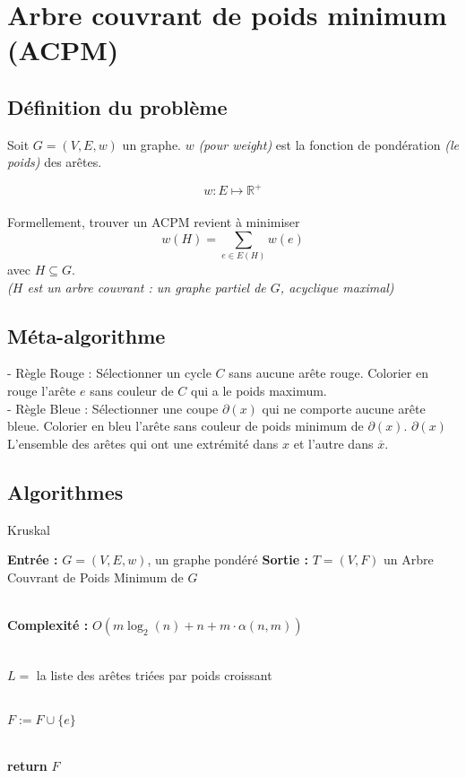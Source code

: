 \documentclass{article}      %
\begin{document}
\section{Arbre couvrant de poids minimum (ACPM)}

\subsection{Définition du problème}
Soit $G = (V, E, w)$ un graphe.
$w$ \textit{(pour weight)} est la fonction de pondération \textit{(le poids)} des arêtes.

$$w : E \mapsto \mathbb{R}^+$$
%
\\
Formellement, trouver un ACPM revient à minimiser 
$$w(H) = \sum_{e \in E(H)} w(e)$$ 
avec $H \subseteq G$.
\\ \textit{($H$ est un arbre couvrant : un graphe partiel de $G$, acyclique maximal)}

\subsection{Méta-algorithme}

- Règle Rouge : Sélectionner un cycle $C$ sans aucune arête rouge.
Colorier en rouge l’arête $e$ sans couleur de $C$ qui a le poids maximum.
\\- Règle Bleue : Sélectionner une coupe $\partial(x)$ qui ne comporte aucune arête bleue.
Colorier en bleu l’arête sans couleur de poids minimum de $\partial(x)$. 
%
$\partial(x)$ L’ensemble des arêtes qui ont une extrémité dans $x$ et l’autre dans $\overline{x}$. 


\subsection{Algorithmes}
\begin{algorithm} \caption{Kruskal}
\begin{algorithmic}

\State \textbf{Entrée :} $G = (V, E, w)$, un graphe pondéré
\State \textbf{Sortie :} $T = (V, F)$ un Arbre Couvrant de Poids Minimum de $G$

\\ \State \textbf{Complexité :} $O(m\log_2(n) + n + m \cdot \alpha(n,m))$

\\ \State $L =$ la liste des arêtes triées par poids croissant

\\
        \State $F := F \cup \{e\}$
    \EndIf
\EndFor

\\ \State \textbf{return} $F$
\end{algorithmic}
\end{algorithm}
\end{document}
